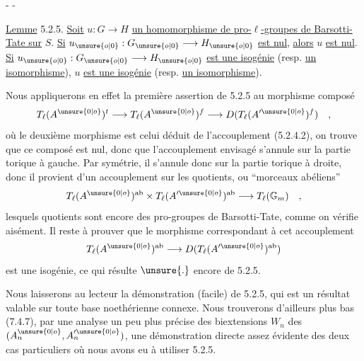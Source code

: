\begin{center}-  -\end{center}

\uline{Lemme} 5.2.5. \uline{Soit} $u:G\longrightarrow H$ \uline{un homomorphisme de pro-$\ell$-groupes de Barsotti-Tate sur} $S$. \uline{Si} $u_{\unsure{o|0}}:G_{\unsure{o|0}}\longrightarrow H_{\unsure{o|0}}$ \uline{est nul}, \uline{alors} $u$ \uline{est nul}. \uline{Si} $u_{\unsure{o|0}}:G_{\unsure{o|0}}\longrightarrow H_{\unsure{o|0}}$ \uline{est une isogénie} (resp. \uline{un isomorphisme}), $u$ \uline{est une isogénie} (resp. \uline{un isomorphisme}).

Nous appliquerons en effet la première assertion de 5.2.5 au morphisme composé
\[
T_\ell(A^{\unsure{0|o}})^t\longrightarrow T_\ell(A^{\unsure{0|o}})^f\longrightarrow D(T_\ell(A'^{\unsure{0|o}})^f)\quad ,
\]
où le deuxième morphisme est celui déduit de l'accouplement (5.2.4.2), on trouve que ce composé est nul, donc que l'accouplement envisagé s'annule sur la partie torique à gauche. Par symétrie, il s'annule donc sur la partie torique à droite, donc il provient d'un accouplement sur les quotients, ou ``morceaux abéliens''
\[
T_\ell(A^{\unsure{0|o}})^{\mathrm{ab}}\times T_\ell(A'^{\unsure{0|o}})^{\mathrm{ab}}\longrightarrow T_\ell(\mathbb G_m)\quad ,
\]
lesquels quotients sont encore des pro-groupes de Barsotti-Tate, comme on vérifie aisément. Il reste à prouver que le morphisme correspondant à cet accouplement
\[
T_\ell(A^{\unsure{0|o}})^{\mathrm{ab}}\longrightarrow D(T_\ell(A'^{\unsure{0|o}})^{\mathrm{ab}})
\]
est une isogénie, ce qui résulte $\unsure{.}$ encore de 5.2.5.

Nous laisserons au lecteur la démonstration (facile) de 5.2.5, qui est un résultat valable sur toute base noethérienne connexe. Nous trouverons d'ailleurs plus bas (7.4.7), par une analyse un peu plus précise des biextensions $W_n$ des $(A_n^{\unsure{0|o}},A_n'^{\unsure{0|o}})$, une démonstration directe assez évidente des deux cas particuliers où nous avons eu à utiliser 5.2.5.
